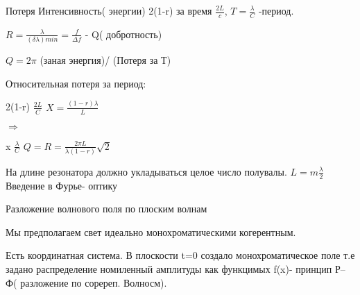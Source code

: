 \documentclass[12pt]{article}
\begin{document}
Потеря Интенсивность( энергии) 2(1-r) за время $\frac{2L}{c}$,  $T=\frac{\lambda}{C}$ -период.

$R=\frac{\lambda}{(\delta\lambda)min}=\frac{f}{\Delta f}$ - Q( добротность)

$Q=2\pi$ (заная энергия)/ (Потеря за Т)

Относительная потеря за период:                    
 
2(1-r) $\frac{2L}{C}$\hspace{3cm} $X=\frac{(1-r)\lambda}{L}$

\hspace{3cm} $\Rightarrow$

x $\frac{\lambda}{C}$  \hspace{4cm}$Q=R=\frac{2\pi L}{\lambda (1-r)}\sqrt{2}$

На длине резонатора должно укладываться целое число полувалы. $L=m\frac{\lambda}{2}$
\newpage \hspace{4cm} Введение в Фурье- оптику

\hspace{2cm} Разложение волнового поля по плоским волнам 

Мы предполагаем свет идеально монохроматическими когерентным.

Есть координатная система. В плоскости t=0 создало монохроматическое поле т.е задано распределение номиленный амплитуды как функцимых f(x)- принцип Р–Ф( разложение по соререп. Волносм).
\end{document}
